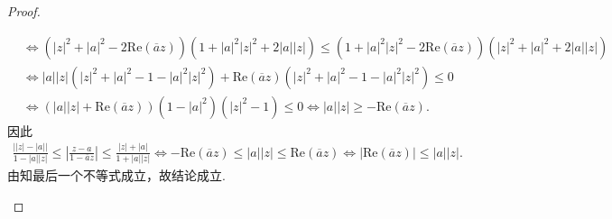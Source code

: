 \documentclass[../../main.tex]{subfiles}%
\begin{document}
\begin{proof}
\begin{enumerate}[(1)]
\begin{align*}
&\Longleftrightarrow \left( \left| z \right|^2+\left| a \right|^2-2\mathrm{Re}\left( \overline{a}z \right) \right) \left( 1+\left| a \right|^2\left| z \right|^2+2\left| a \right|\left| z \right| \right) \leqslant \left( 1+\left| a \right|^2\left| z \right|^2-2\mathrm{Re}\left( \overline{a}z \right) \right) \left( \left| z \right|^2+\left| a \right|^2+2\left| a \right|\left| z \right| \right) \\
&\Longleftrightarrow \left| a \right|\left| z \right|\left( \left| z \right|^2+\left| a \right|^2-1-\left| a \right|^2\left| z \right|^2 \right) +\mathrm{Re}\left( \overline{a}z \right) \left( \left| z \right|^2+\left| a \right|^2-1-\left| a \right|^2\left| z \right|^2 \right) \leqslant 0\\
&\Longleftrightarrow \left( \left| a \right|\left| z \right|+\mathrm{Re}\left( \overline{a}z \right) \right) \left( 1-\left| a \right|^2 \right) \left( \left| z \right|^2-1 \right) \leqslant 0\Longleftrightarrow \left| a \right|\left| z \right|\geqslant -\mathrm{Re}\left( \overline{a}z \right) .
\end{align*}
因此
\begin{align*}
\frac{\left| \left| z \right|-\left| a \right| \right|}{1-\left| a \right|\left| z \right|}\leqslant \left| \frac{z-a}{1-\overline{a}z} \right|\leqslant \frac{\left| z \right|+\left| a \right|}{1+\left| a \right|\left| z \right|}
\Longleftrightarrow -\mathrm{Re}\left( \overline{a}z \right) \leqslant \left| a \right|\left| z \right|\leqslant \mathrm{Re}\left( \overline{a}z \right) \Longleftrightarrow \left| \mathrm{Re}\left( \overline{a}z \right) \right|\leqslant \left| a \right|\left| z \right|.
\end{align*}
由知最后一个不等式成立，故结论成立.
\end{enumerate}
\end{proof}
\end{document}
